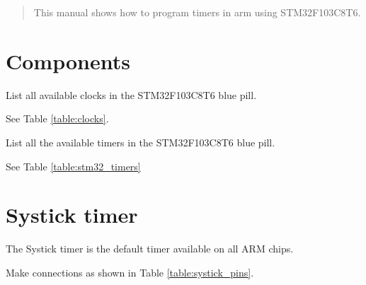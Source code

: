 \documentclass[journal,12pt,twocolumn]{IEEEtran}
\begin{document}
\tableofcontents


\IEEEpeerreviewmaketitle

\bigskip

\begin{abstract}
This manual shows how to program timers in arm using STM32F103C8T6.
\end{abstract}
\section{Components}

\begin{problem}
List all available clocks in the STM32F103C8T6 blue pill.
\end{problem}
\solution See Table \ref{table:clocks}.
\begin{table}[!h]

\caption{}
\label{table:clocks}
\end{table}
\begin{problem}
List all the available timers in the STM32F103C8T6 blue pill.
\end{problem}
\solution  See Table \ref{table:stm32_timers}
\begin{table}[!h]
\footnotesize

\caption{}
\label{table:stm32_timers}
\end{table}

\section{Systick timer}
The Systick timer is the default timer available on all ARM chips. 
\begin{problem}
Make connections as shown in Table \ref{table:systick_pins}.
\end{problem}
\begin{table}[!h]
\footnotesize

\caption{}
\label{table:systick_pins}
\end{table}
\end{document}

